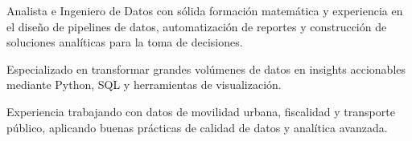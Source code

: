 







Analista e Ingeniero de Datos con sólida formación matemática y experiencia en el diseño de pipelines de datos, automatización de reportes y construcción de soluciones analíticas para la toma de decisiones. 

Especializado en transformar grandes volúmenes de datos en insights accionables mediante Python, SQL y herramientas de visualización.

Experiencia trabajando con datos de movilidad urbana, fiscalidad y transporte público, aplicando buenas prácticas de calidad de datos y analítica avanzada.